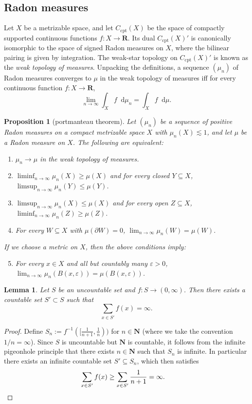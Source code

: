 \documentclass[reqno,11pt]{amsart}
\newcommand{\NN}{\mathbf{N}}
\newcommand{\RR}{\mathbf{R}}
\newcommand*\dif{\mathop{}\!\mathrm{d}}
\newcommand{\dfn}[1]{\emph{#1}\index{#1}}
\newcommand{\cpt}{\mathrm{cpt}}
\newtheorem{lemma}[theorem]{Lemma}
\newtheorem{proposition}[theorem]{Proposition}
\theoremstyle{definition}
\numberwithin{equation}{section}
\begin{document}
\subsection{Radon measures}\label{portmanteau appendix}
Let $X$ be a metrizable space, and let $C_\cpt(X)$ be the space of compactly supported continuous functions $f: X \to \RR$.
Its dual $C_\cpt(X)'$ is canonically isomorphic to the space of signed Radon measures on $X$, where the bilinear pairing is given by integration.
The weak-star topology on $C_\cpt(X)'$ is known as the \dfn{weak topology of measures}.
Unpacking the definitions, a sequence $(\mu_n)$ of Radon measures converges to $\mu$ in the weak topology of measures iff for every continuous function $f: X \to \RR$,
$$\lim_{n \to \infty} \int_X f \dif \mu_n = \int_X f \dif \mu.$$

\begin{proposition}[portmanteau theorem]\label{portmanteau}
	Let $(\mu_n)$ be a sequence of positive Radon measures on a compact metrizable space $X$ with $\mu_n(X) \lesssim 1$, and let $\mu$ be a Radon measure on $X$. The following are equivalent:
\begin{enumerate}
	\item $\mu_n \to \mu$ in the weak topology of measures.
	\item $\liminf_{n \to \infty} \mu_n(X) \geq \mu(X)$ and for every closed $Y \subseteq X$, $\limsup_{n \to \infty} \mu_n(Y) \leq \mu(Y)$.
	\item $\limsup_{n \to \infty} \mu_n(X) \leq \mu(X)$ and for every open $Z \subseteq X$, $\liminf_{n \to \infty} \mu_n(Z) \geq \mu(Z)$.
	\item For every $W \subseteq X$ with $\mu(\partial W) = 0$, $\lim_{n \to \infty} \mu_n(W) = \mu(W)$.
\end{enumerate}
	If we choose a metric on $X$, then the above conditions imply:
\begin{enumerate}
	\setcounter{enumi}{4}
	\item For every $x \in X$ and all but countably many $\varepsilon > 0$, $\lim_{n \to \infty} \mu_n(B(x, \varepsilon)) = \mu(B(x, \varepsilon))$.
\end{enumerate}
\end{proposition}

\begin{lemma}\label{cardinality appendix}
Let $S$ be an uncountable set and $f: S \to (0, \infty)$. Then there exists a countable set $S' \subset S$ such that
$$\sum_{x \in S'} f(x) = \infty.$$
\end{lemma}
\begin{proof}
Define $S_n := f^{-1}([\frac{1}{n + 1}, \frac{1}{n}))$ for $n \in \NN$ (where we take the convention $1/n = \infty$).
Since $S$ is uncountable but $\NN$ is countable, it follows from the infinite pigeonhole principle that there exists $n \in \NN$ such that $S_n$ is infinite.
In particular there exists an infinite countable set $S' \subseteq S_n$, which then satisfies
\begin{align*}
\sum_{x \in S'} f(x) &\geq \sum_{x \in S'} \frac{1}{n + 1} = \infty. \qedhere 
\end{align*}
\end{proof}
\end{document}
